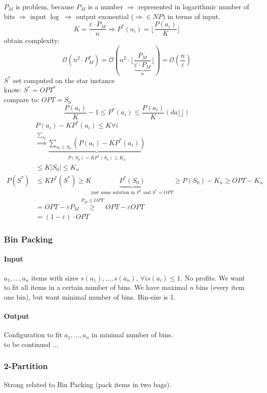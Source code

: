 $P_M$ is problem, because $P_M$ is a number $\Rightarrow$ represented in logarithmic number of bits $\Rightarrow$ input $\log$ $\Rightarrow$ output exonential ($\Rightarrow\in NP$) in terms of input. \\
$$ K = \frac{\varepsilon \cdot P_M}{n} \Rightarrow P^*(a_i) = \lfloor \frac{P(a_i)}{K} \rfloor $$
obtain complexity: $$\mathcal{O}(n^2 \cdot P_M^*) = \mathcal{O}(n^2 \cdot \lfloor \frac{P_M}{\underbrace{\varepsilon \cdot P_M}_{n}} \rfloor
) = \mathcal{O}(\frac{n}{\varepsilon})$$
$S^*$ set computed on the star instance \\
know: $S^* = OPT^*$ \\
compare to: $OPT = S_0$
$$\frac{P(a_i)}{K}-1 \leq P^*(a_i) \leq \frac{P(a_i)}{K} (da \lfloor\rfloor )$$
\begin{align*}
	&P(a_i) - K P^*(a_i) \leq K \forall i \\
	&\stackrel{\sum_{S_0}}{\Rightarrow} \underbrace{\sum_{a_i \in S_0}(P(a_i) - KP^*(a_i))}_{P(S_0) = KP^*(S_0) \leq K_n} \\
	& \leq K|S_0| \leq K_n \\
	P(S^*) &\leq KP^*(S^*) \geq K\underbrace{P^*(S_0)}_{\text{just some solution in $P^*$ and $S^* = OPT$}} \geq P(S_0) - K_n \geq OPT - K_n \\
	&= OPT - \varepsilon P_M \stackrel{P_M \leq OPT}{\geq} OPT - \varepsilon OPT \\
	&= (1 - \varepsilon) \cdot OPT
\end{align*}
\subsubsection{Bin Packing}
\paragraph{Input} $a_1,...,a_n$ items with sizes $s(a_1),...,s(a_n)$, $\forall i s(a_i) \leq 1$. No profits. We want to fit all items in a certain number of bins. We have maximal $n$ bins (every item one bin), but want minimal number of bins. Bin-size is 1.
\paragraph{Output} Configuration to fit $a_1,...,a_n$ in minimal number of bins. \\
to be continued ...
\subsubsection{2-Partition}
Strong related to Bin Packing (pack items in two bags). 
